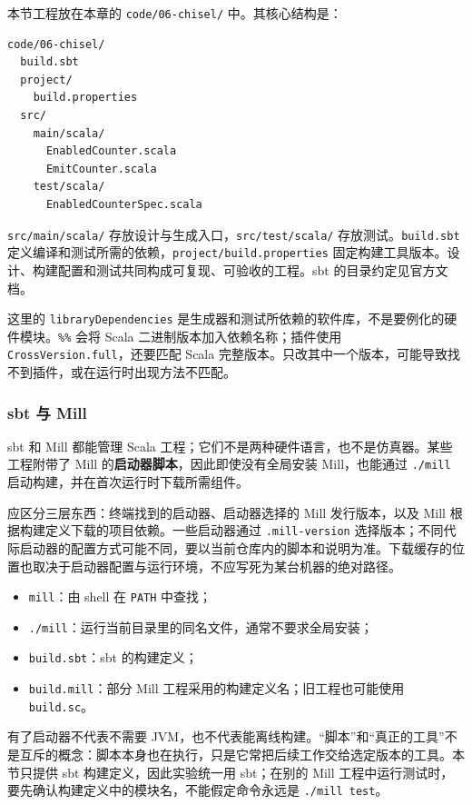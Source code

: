 本节工程放在本章的 \texttt{code/06-chisel/} 中。其核心结构是：

\begin{lstlisting}[language={},numbers=none]
code/06-chisel/
  build.sbt
  project/
    build.properties
  src/
    main/scala/
      EnabledCounter.scala
      EmitCounter.scala
    test/scala/
      EnabledCounterSpec.scala
\end{lstlisting}

\texttt{src/main/scala/} 存放设计与生成入口，\texttt{src/test/scala/} 存放测试。\texttt{build.sbt} 定义编译和测试所需的依赖，\texttt{project/build.properties} 固定构建工具版本。设计、构建配置和测试共同构成可复现、可验收的工程。sbt 的目录约定见官方文档\citep{c02-sbt-guide}。


这里的 \texttt{libraryDependencies} 是生成器和测试所依赖的软件库，不是要例化的硬件模块。\texttt{\%\%} 会将 Scala 二进制版本加入依赖名称；插件使用 \texttt{CrossVersion.full}，还要匹配 Scala 完整版本。只改其中一个版本，可能导致找不到插件，或在运行时出现方法不匹配。

\subsubsection*{sbt 与 Mill}

sbt 和 Mill 都能管理 Scala 工程；它们不是两种硬件语言，也不是仿真器。某些工程附带了 Mill 的\textbf{启动器脚本}，因此即使没有全局安装 Mill，也能通过 \texttt{./mill} 启动构建，并在首次运行时下载所需组件。

应区分三层东西：终端找到的启动器、启动器选择的 Mill 发行版本，以及 Mill 根据构建定义下载的项目依赖。一些启动器通过 \texttt{.mill-version} 选择版本；不同代际启动器的配置方式可能不同，要以当前仓库内的脚本和说明为准。下载缓存的位置也取决于启动器配置与运行环境，不应写死为某台机器的绝对路径。

\begin{itemize}
  \item \texttt{mill}：由 shell 在 \texttt{PATH} 中查找；
  \item \texttt{./mill}：运行当前目录里的同名文件，通常不要求全局安装；
  \item \texttt{build.sbt}：sbt 的构建定义；
  \item \texttt{build.mill}：部分 Mill 工程采用的构建定义名；旧工程也可能使用 \texttt{build.sc}。
\end{itemize}

有了启动器不代表不需要 JVM，也不代表能离线构建。“脚本”和“真正的工具”不是互斥的概念：脚本本身也在执行，只是它常把后续工作交给选定版本的工具。本节只提供 sbt 构建定义，因此实验统一用 sbt；在别的 Mill 工程中运行测试时，要先确认构建定义中的模块名，不能假定命令永远是 \texttt{./mill test}。

